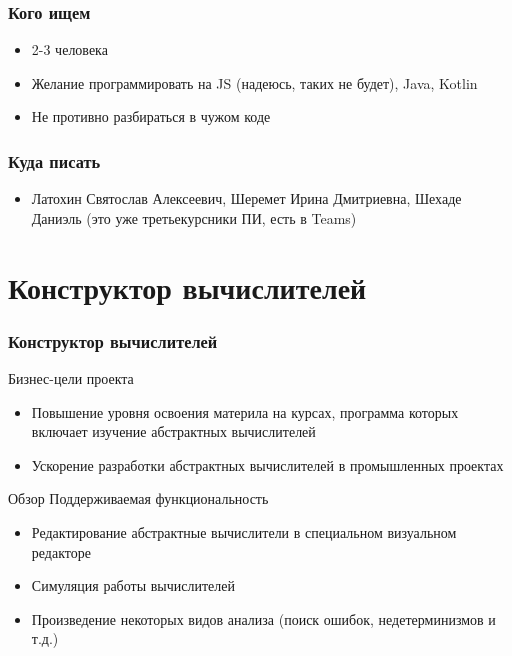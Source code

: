 \documentclass[xetex,mathserif,serif]{beamer}
\begin{document}
    \begin{frame}
        \frametitle{Кого ищем}
        \begin{itemize}
            \item 2-3 человека
            \item Желание программировать на JS (надеюсь, таких не будет), Java, Kotlin
            \item Не противно разбираться в чужом коде
        \end{itemize}
    \end{frame}

    \begin{frame}
        \frametitle{Куда писать}
        \begin{itemize}
            \item Латохин Святослав Алексеевич, Шеремет Ирина Дмитриевна, Шехаде Даниэль (это уже третьекурсники ПИ, есть в Teams)
        \end{itemize}
    \end{frame}

    \section{Конструктор вычислителей}

    \begin{frame}  
        \frametitle{Конструктор вычислителей}
        Бизнес-цели проекта
        \begin{itemize}
            \item Повышение уровня освоения материла на курсах, программа которых включает изучение абстрактных вычислителей
            \item Ускорение разработки абстрактных вычислителей в промышленных проектах
        \end{itemize}
        \end{frame}
        
        \begin{frame}{Обзор}
            Поддерживаемая функциональность
            \begin{itemize}
                \item Редактирование абстрактные вычислители в специальном визуальном редакторе
                \item Симуляция работы вычислителей
                \item Произведение некоторых видов анализа (поиск ошибок, недетерминизмов и т.д.)
            \end{itemize}
        \end{frame}
        
\end{document}
